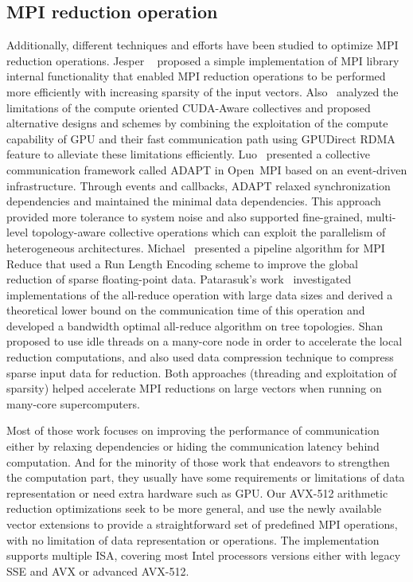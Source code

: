 \documentclass[sigconf]{acmart}
\newcommand{\ompi}[0]{Open~MPI\xspace}
\newcommand{\mpi}[0]{\textsc{MPI}\xspace}
\begin{document}
\subsection{\mpi reduction operation}
Additionally, different techniques and
efforts have been studied to optimize \mpi reduction operations. Jesper
~\cite{Neutral_MPI_Reduction} proposed a simple implementation of MPI library
internal functionality that enabled MPI reduction operations to be performed
more efficiently with increasing sparsity of the input vectors.
%
Also~\cite{gpu-reduce} analyzed the limitations of the compute oriented CUDA-Aware
collectives and proposed alternative designs and schemes by combining the exploitation of the
compute capability of GPU and their fast communication
path using GPUDirect RDMA feature to alleviate these limitations efficiently.
%
Luo~\cite{Luo-adapt} presented a collective communication framework called ADAPT
in \ompi based on an event-driven infrastructure. Through events and callbacks,
ADAPT relaxed synchronization dependencies and maintained the minimal data dependencies.
This approach provided more tolerance to system noise and also supported fine-grained,
multi-level topology-aware collective operations which can exploit the
parallelism of heterogeneous architectures.
%
Michael~\cite{sparse-reduction} presented a pipeline algorithm for MPI Reduce
that used a Run Length Encoding scheme to improve the global reduction of sparse
floating-point data.
Patarasuk's work~\cite{allreduce-optimal} investigated implementations of the all-reduce operation
with large data sizes and derived a theoretical lower bound on the communication time of this operation and developed
a bandwidth optimal all-reduce algorithm on tree topologies.
%
Shan~\cite{shan-reduce} proposed to use idle threads on a many-core node in order to accelerate
the local reduction computations, and also used data compression technique to compress sparse input data for reduction.
Both approaches (threading and exploitation
of sparsity) helped accelerate MPI reductions on large vectors when
running on many-core supercomputers.
%

Most of those work focuses on improving the performance of
communication either by relaxing dependencies or hiding the communication latency behind computation.
And for the minority of those work that endeavors to strengthen the computation part,
they usually have some requirements or limitations of data
representation or need extra hardware such as GPU.
Our AVX-512 arithmetic reduction
optimizations seek to be more general, and use the newly available vector extensions to provide a
straightforward set of predefined MPI operations, with no limitation of data representation or operations.
The implementation supports multiple ISA, covering most Intel processors versions either with legacy SSE and AVX or advanced AVX-512.
\end{document}
